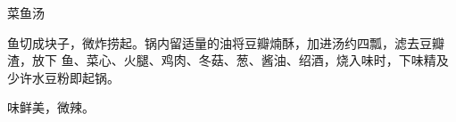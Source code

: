 %
%
%
%
%
%
%
\begin{recipe}{菜鱼汤}

\ingredients


\preparation

鱼切成块子，微炸捞起。锅内留适量的油将豆瓣煵酥，加进汤约四瓢，滤去豆瓣渣，放下
鱼、菜心、火腿、鸡肉、冬菇、葱、酱油、绍酒，烧入味时，下味精及少许水豆粉即起锅。

\features

味鲜美，微辣。

\end{recipe}

